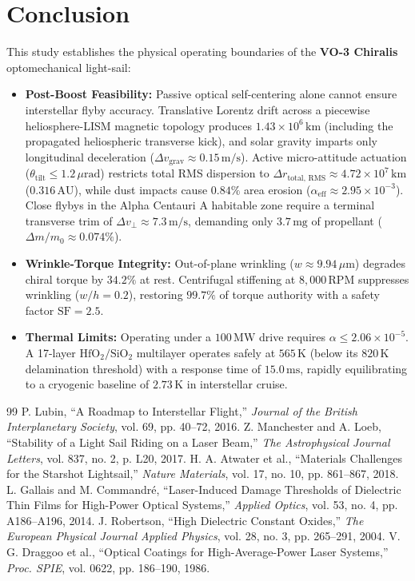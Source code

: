 \documentclass[11pt, a4paper]{article}
\begin{document}
\section{Conclusion}

This study establishes the physical operating boundaries of the \textbf{VO-3 Chiralis} optomechanical light-sail:
\begin{itemize}
    \item \textbf{Post-Boost Feasibility:} Passive optical self-centering alone cannot ensure interstellar flyby accuracy. Translative Lorentz drift across a piecewise heliosphere-LISM magnetic topology produces $1.43 \times 10^6\,\text{km}$ (including the propagated heliospheric transverse kick), and solar gravity imparts only longitudinal deceleration ($\Delta v_{\text{grav}} \approx 0.15\,\text{m/s}$). Active micro-attitude actuation ($\theta_{\text{tilt}} \le 1.2\,\mu\text{rad}$) restricts total RMS dispersion to $\Delta r_{\text{total, RMS}} \approx 4.72 \times 10^7\,\text{km}$ ($0.316\,\text{AU}$), while dust impacts cause $0.84\%$ area erosion ($\alpha_{\text{eff}} \approx 2.95 \times 10^{-3}$). Close flybys in the Alpha Centauri A habitable zone require a terminal transverse trim of $\Delta v_{\perp} \approx 7.3\,\text{m/s}$, demanding only $3.7\,\text{mg}$ of propellant ($\Delta m / m_0 \approx 0.074\%$).
    \item \textbf{Wrinkle-Torque Integrity:} Out-of-plane wrinkling ($w \approx 9.94\,\mu\text{m}$) degrades chiral torque by $34.2\%$ at rest. Centrifugal stiffening at $8,000\,\text{RPM}$ suppresses wrinkling ($w/h = 0.2$), restoring $99.7\%$ of torque authority with a safety factor $\mathrm{SF} = 2.5$.
    \item \textbf{Thermal Limits:} Operating under a $100\,\text{MW}$ drive requires $\alpha \le 2.06 \times 10^{-5}$. A 17-layer $\text{HfO}_2/\text{SiO}_2$ multilayer operates safely at $565\,\text{K}$ (below its $820\,\text{K}$ delamination threshold) with a response time of $15.0\,\text{ms}$, rapidly equilibrating to a cryogenic baseline of $2.73\,\text{K}$ in interstellar cruise.
\end{itemize}

\begin{thebibliography}{99}
 P. Lubin, ``A Roadmap to Interstellar Flight,'' \textit{Journal of the British Interplanetary Society}, vol. 69, pp. 40--72, 2016.
 Z. Manchester and A. Loeb, ``Stability of a Light Sail Riding on a Laser Beam,'' \textit{The Astrophysical Journal Letters}, vol. 837, no. 2, p. L20, 2017.
 H. A. Atwater et al., ``Materials Challenges for the Starshot Lightsail,'' \textit{Nature Materials}, vol. 17, no. 10, pp. 861--867, 2018.
 L. Gallais and M. Commandr{\'e}, ``Laser-Induced Damage Thresholds of Dielectric Thin Films for High-Power Optical Systems,'' \textit{Applied Optics}, vol. 53, no. 4, pp. A186--A196, 2014.
 J. Robertson, ``High Dielectric Constant Oxides,'' \textit{The European Physical Journal Applied Physics}, vol. 28, no. 3, pp. 265--291, 2004.
 V. G. Draggoo et al., ``Optical Coatings for High-Average-Power Laser Systems,'' \textit{Proc. SPIE}, vol. 0622, pp. 186--190, 1986.
\end{thebibliography}
\end{document}
